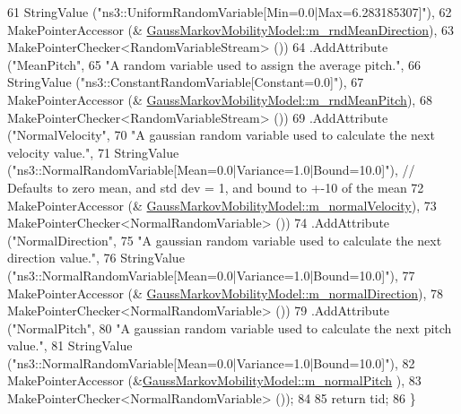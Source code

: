 \begin{DoxyCode}
61                    StringValue (\textcolor{stringliteral}{"ns3::UniformRandomVariable[Min=0.0|Max=6.283185307]"}),
62                    MakePointerAccessor (&
      \hyperlink{classns3_1_1GaussMarkovMobilityModel_aca9f735142434714b98f842867219578}{GaussMarkovMobilityModel::m\_rndMeanDirection}),
63                    MakePointerChecker<RandomVariableStream> ())
64     .AddAttribute (\textcolor{stringliteral}{"MeanPitch"},
65                    \textcolor{stringliteral}{"A random variable used to assign the average pitch."},
66                    StringValue (\textcolor{stringliteral}{"ns3::ConstantRandomVariable[Constant=0.0]"}),
67                    MakePointerAccessor (&
      \hyperlink{classns3_1_1GaussMarkovMobilityModel_a9b24b63f6d9177ace0f90e3b76e49a27}{GaussMarkovMobilityModel::m\_rndMeanPitch}),
68                    MakePointerChecker<RandomVariableStream> ())
69     .AddAttribute (\textcolor{stringliteral}{"NormalVelocity"},
70                    \textcolor{stringliteral}{"A gaussian random variable used to calculate the next velocity value."},
71                    StringValue (\textcolor{stringliteral}{"ns3::NormalRandomVariable[Mean=0.0|Variance=1.0|Bound=10.0]"}), \textcolor{comment}{// Defaults
       to zero mean, and std dev = 1, and bound to +-10 of the mean}
72                    MakePointerAccessor (&
      \hyperlink{classns3_1_1GaussMarkovMobilityModel_a68773ff0fbf46d9690a0b7b9a85f49ee}{GaussMarkovMobilityModel::m\_normalVelocity}),
73                    MakePointerChecker<NormalRandomVariable> ())
74     .AddAttribute (\textcolor{stringliteral}{"NormalDirection"},
75                    \textcolor{stringliteral}{"A gaussian random variable used to calculate the next direction value."},
76                    StringValue (\textcolor{stringliteral}{"ns3::NormalRandomVariable[Mean=0.0|Variance=1.0|Bound=10.0]"}),
77                    MakePointerAccessor (&
      \hyperlink{classns3_1_1GaussMarkovMobilityModel_a05f43bae64f0bd5185c9f8d6751c1fb5}{GaussMarkovMobilityModel::m\_normalDirection}),
78                    MakePointerChecker<NormalRandomVariable> ())
79     .AddAttribute (\textcolor{stringliteral}{"NormalPitch"},
80                    \textcolor{stringliteral}{"A gaussian random variable used to calculate the next pitch value."},
81                    StringValue (\textcolor{stringliteral}{"ns3::NormalRandomVariable[Mean=0.0|Variance=1.0|Bound=10.0]"}),
82                    MakePointerAccessor (&\hyperlink{classns3_1_1GaussMarkovMobilityModel_a1563f603818a75cfd2bd92e0852b3c8e}{GaussMarkovMobilityModel::m\_normalPitch}
      ),
83                    MakePointerChecker<NormalRandomVariable> ());
84 
85   \textcolor{keywordflow}{return} tid;
86 \}
\end{DoxyCode}


